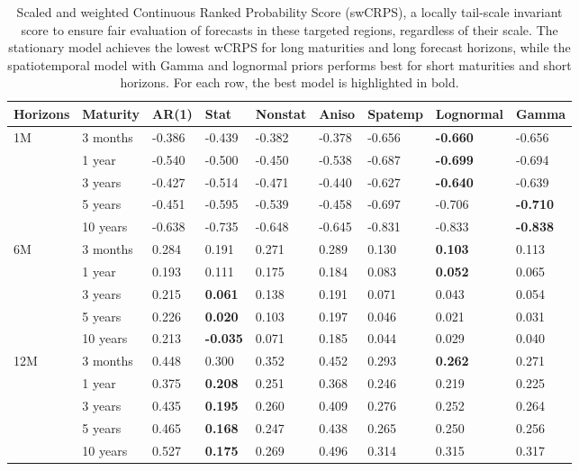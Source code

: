 \documentclass[
  12pt]{article}
\begin{document}
\begin{table}[t!p]
    \centering
    \caption{Scaled and weighted Continuous Ranked Probability Score (swCRPS), a locally tail-scale invariant score to ensure fair evaluation of forecasts in these targeted regions, regardless of their scale. The stationary model achieves the lowest wCRPS for long maturities and long forecast horizons, while the spatiotemporal model with Gamma and lognormal priors performs best for short maturities and short horizons. For each row, the best model is highlighted in bold.} 
    \begin{tabular}{l l l l l l l l l }
    \hline
        Horizons & Maturity & AR(1) & Stat & Nonstat & Aniso & Spatemp & Lognormal & Gamma \\ \hline
        1M & 3 months & -0.386 & -0.439 & -0.382 & -0.378 & -0.656 & \textbf{-0.660} & -0.656 \\ 
        ~ & 1 year & -0.540 & -0.500 & -0.450 & -0.538 & -0.687 & \textbf{-0.699} & -0.694 \\ 
        ~ & 3 years & -0.427 & -0.514 & -0.471 & -0.440 & -0.627 & \textbf{-0.640} & -0.639 \\ 
        ~ & 5 years & -0.451 & -0.595 & -0.539 & -0.458 & -0.697 & -0.706 & \textbf{-0.710} \\ 
        ~ & 10 years & -0.638 & -0.735 & -0.648 & -0.645 & -0.831 & -0.833 & \textbf{-0.838} \\ \hline
        6M & 3 months & 0.284 & 0.191 & 0.271 & 0.289 & 0.130 & \textbf{0.103} & 0.113 \\ 
        ~ & 1 year & 0.193 & 0.111 & 0.175 & 0.184 & 0.083 & \textbf{0.052} & 0.065 \\ 
        ~ & 3 years & 0.215 & \textbf{0.061} & 0.138 & 0.191 & 0.071 & 0.043 & 0.054 \\ 
        ~ & 5 years & 0.226 & \textbf{0.020} & 0.103 & 0.197 & 0.046 & 0.021	& 0.031 \\ 
        ~ & 10 years & 0.213 & \textbf{-0.035} & 0.071 & 0.185 & 0.044 & 0.029 & 0.040 \\ \hline
        12M & 3 months & 0.448 & 0.300 & 0.352 & 0.452 & 0.293 & \textbf{0.262} & 0.271 \\ 
        ~ & 1 year & 0.375 & \textbf{0.208} & 0.251 & 0.368 & 0.246 & 0.219 & 0.225 \\ 
        ~ & 3 years & 0.435 & \textbf{0.195} & 0.260 & 0.409 & 0.276 & 0.252 & 0.264 \\ 
        ~ & 5 years & 0.465 & \textbf{0.168} & 0.247 & 0.438 & 0.265 & 0.250 & 0.256 \\ 
        ~ & 10 years & 0.527 & \textbf{0.175} & 0.269 & 0.496 & 0.314 & 0.315 & 0.317 \\ \hline
    \end{tabular}
    \label{swcrps}
\end{table}
\end{document}
